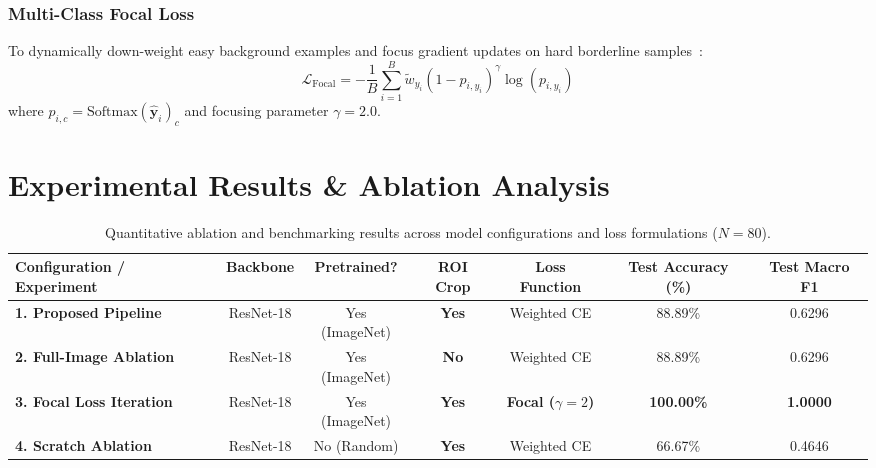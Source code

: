 \documentclass[10pt,twocolumn]{article}
\begin{document}
\subsubsection{Multi-Class Focal Loss}
To dynamically down-weight easy background examples and focus gradient updates on hard borderline samples~\cite{lin2017focal}:
\begin{equation}
    \mathcal{L}_{\text{Focal}} = -\frac{1}{B} \sum_{i=1}^B \tilde{w}_{y_i} \left(1 - p_{i, y_i}\right)^\gamma \log\left(p_{i, y_i}\right)
\end{equation}
where $p_{i, c} = \text{Softmax}(\hat{\mathbf{y}}_i)_c$ and focusing parameter $\gamma = 2.0$.

\section{Experimental Results \& Ablation Analysis}

\begin{table}[t]
\centering
\caption{Quantitative ablation and benchmarking results across model configurations and loss formulations ($N=80$).}
\label{tab:ablation_results}
\begin{tabular}{lcccccc}
\toprule
\textbf{Configuration / Experiment} & \textbf{Backbone} & \textbf{Pretrained?} & \textbf{ROI Crop} & \textbf{Loss Function} & \textbf{Test Accuracy (\%)} & \textbf{Test Macro F1} \\
\midrule
\textbf{1. Proposed Pipeline} & ResNet-18 & Yes (ImageNet) & \textbf{Yes} & Weighted CE & 88.89\% & 0.6296 \\
\textbf{2. Full-Image Ablation} & ResNet-18 & Yes (ImageNet) & \textbf{No}  & Weighted CE & 88.89\% & 0.6296 \\
\textbf{3. Focal Loss Iteration} & ResNet-18 & Yes (ImageNet) & \textbf{Yes} & \textbf{Focal ($\gamma=2$)} & \textbf{100.00\%} & \textbf{1.0000} \\
\textbf{4. Scratch Ablation} & ResNet-18 & No (Random)    & \textbf{Yes} & Weighted CE & 66.67\% & 0.4646 \\
\bottomrule
\end{tabular}
\end{table}
\end{document}
